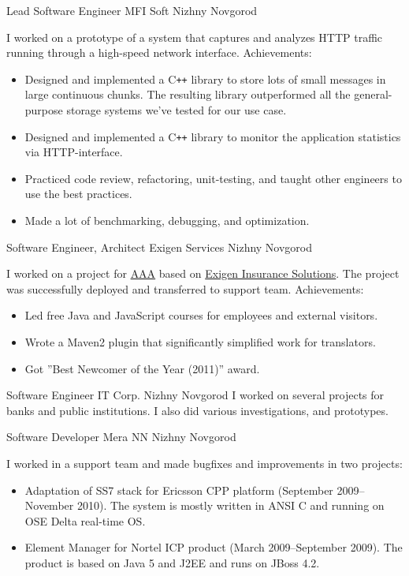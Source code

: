 \documentclass[11pt,a4paper,sans]{moderncv}
\newcommand{\Cpp}{C{}\texttt{++}}
\begin{document}
{Lead Software Engineer}
{MFI Soft}
{Nizhny Novgorod}
{}
{I worked on a prototype of a system that captures and analyzes HTTP
traffic running through a high-speed network interface.
\newline{}
Achievements:
\begin{itemize}
\item Designed and implemented a \Cpp{} library to store lots of small
  messages in large continuous chunks. The resulting library
  outperformed all the general-purpose storage systems we've tested
  for our use case.
\item Designed and implemented a \Cpp{} library to monitor the
  application statistics via HTTP-interface.
\item Practiced code review, refactoring, unit-testing, and taught
  other engineers to use the best practices.
\item Made a lot of benchmarking, debugging, and optimization.
\end{itemize}
}

{Software Engineer, Architect}
{Exigen Services}
{Nizhny Novgorod}
{}
{I worked on a project for
\href{http://www.aaa.com/PPInternational/International.html}{AAA}
based on
\href{http://www.exigeninsurance.com/business-solutions/overview.html}{Exigen Insurance Solutions}.
The project was successfully deployed and transferred to support team.
\newline{}
Achievements:
\begin{itemize}
\item Led free Java and JavaScript courses for employees and external
  visitors.
\item Wrote a Maven2 plugin that significantly simplified work for
  translators.
\item Got ''Best Newcomer of the Year (2011)'' award.
\end{itemize}
}

{Software Engineer}
{IT Corp.}
{Nizhny Novgorod}
{}
{I worked on several projects for banks and public institutions. I
  also did various investigations, and prototypes.}

{Software Developer}
{Mera NN}
{Nizhny Novgorod}
{}
{I worked in a support team and made bugfixes and improvements in two
  projects:
\begin{itemize}
\item Adaptation of SS7 stack for Ericsson CPP platform (September
  2009--November 2010).  The system is mostly written in ANSI C and
  running on OSE Delta real-time OS.
\item Element Manager for Nortel ICP product (March 2009--September
  2009).  The product is based on Java 5 and J2EE and runs on JBoss
  4.2.
\end{itemize}
}
\end{document}
